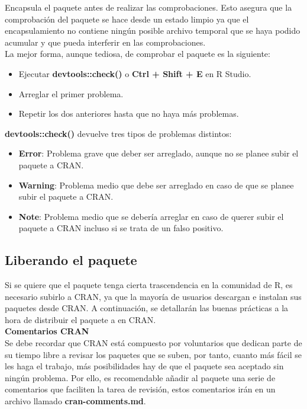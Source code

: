 Encapsula el paquete antes de realizar las comprobaciones. Esto asegura que la
comprobaci\'on del paquete se hace desde un estado limpio ya que el encapsulamiento no
contiene ning\'un posible archivo temporal que se haya podido acumular y que pueda interferir
en las comprobaciones.\\

La mejor forma, aunque tediosa, de comprobar el paquete es la siguiente:

\begin{itemize}
    \item Ejecutar \textbf{devtools::check()} o \textbf{Ctrl + Shift + E} en R Studio.
    \item Arreglar el primer problema.
    \item Repetir los dos anteriores hasta que no haya m\'as problemas.
\end{itemize}

\textbf{devtools::check()} devuelve tres tipos de problemas distintos:

\begin{itemize}
    \item \textbf{Error}: Problema grave que deber ser arreglado, aunque no se planee subir el paquete a CRAN.
    \item \textbf{Warning}: Problema medio que debe ser arreglado en caso de que se planee subir el paquete a CRAN.
    \item \textbf{Note}: Problema medio que se deber\'ia arreglar en caso de querer subir el paquete a CRAN incluso si se trata de un falso positivo.
\end{itemize}


\subsection{Liberando el paquete}

Si se quiere que el paquete tenga cierta trascendencia en la comunidad de R, es necesario subirlo a CRAN, ya que la mayor\'ia de usuarios descargan e instalan sus paquetes desde CRAN.
A continuaci\'on, se detallar\'an las buenas pr\'acticas a la hora de distribuir el paquete a en CRAN. \\

\textbf{Comentarios CRAN}\\
Se debe recordar que CRAN est\'a compuesto por voluntarios que dedican parte de su tiempo
libre a revisar los paquetes que se suben, por tanto, cuanto m\'as f\'acil se les haga el trabajo,
m\'as posibilidades hay de que el paquete sea aceptado sin ning\'un problema.
Por ello, es recomendable a\~nadir al paquete una serie de comentarios que faciliten la tarea de revisi\'on, estos comentarios ir\'an en un archivo llamado \textbf{cran-comments.md}.

